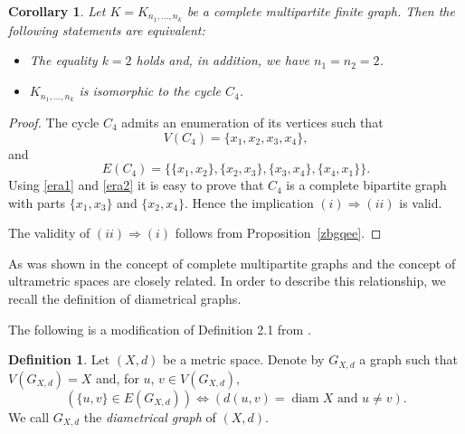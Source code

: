 \documentclass[11pt]{article}
\newtheorem{corollary}[theorem]{Corollary}
\theoremstyle{definition}
\newtheorem{definition}[theorem]{Definition}
\theoremstyle{remark}
\numberwithin{equation}{section}
\begin{document}
\begin{corollary}\label{renjh}
Let $K=K_{n_1,\ldots,n_k}$ be a complete multipartite finite graph. 
Then the following statements are equivalent:
\begin{itemize}[left=10pt]
    \item[(i)] The equality $k=2$ holds and, in addition, we have  $n_1=n_2=2$.

    \item[(ii)] $K_{n_1,\ldots,n_k}$ is isomorphic to the cycle $C_4$.
\end{itemize} 
\end{corollary}

\begin{proof}
 The cycle $C_4$ admits an enumeration of its vertices such that 
\begin{equation}
    \label{era1}
V(C_4)=\{x_1,x_2,x_3,x_4\}, 
\end{equation}
and
\begin{equation}
    \label{era2}
E(C_4)=\{\{x_1,x_2\},\{x_2,x_3\},\{x_3,x_4\},\{x_4,x_1\}\}.
\end{equation}
Using \eqref{era1} and \eqref{era2} it is easy to prove that $C_4$ is a complete bipartite graph with parts $\{x_1,x_3\}$ and $\{x_2,x_4\}$. Hence the implication $(i)\Rightarrow (ii)$ is valid.  

The validity of $(ii)\Rightarrow(i)$ follows from Proposition~\ref{zbgqee}. 

\end{proof}







As was shown in \cite{DDP2011pNUAA}
the concept of complete multipartite graphs and the concept of
ultrametric spaces are closely related. In order
to describe this relationship, we recall the definition of diametrical graphs.


The following is a modification of Definition 2.1 from \cite{PD2014JMS}.


\begin{definition}\label{d5.2}
Let $(X,d)$ be a metric space. Denote by \(G_{X,d}\) a graph such that \(V(G_{X,d}) = X\) and, for \(u\), \(v \in V(G_{X,d})\),
\begin{equation}\label{d5.2:e1}
(\{u,v\}\in E(G_{X,d}))\Leftrightarrow (d(u,v)=\operatorname{diam} X \text{ and } u \neq v).
\end{equation}
We call $G_{X,d}$ the \emph{diametrical graph} of \((X, d)\).
\end{definition}
\end{document}
